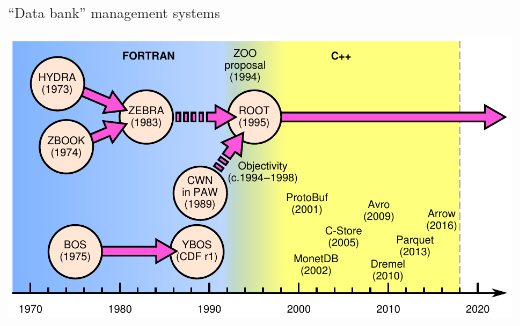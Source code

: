 \documentclass[aspectratio=169]{beamer}
\begin{document}
\begin{frame}{``Data bank'' management systems}
\vspace{0.25 cm}
\begin{center}
\includegraphics[width=0.95\linewidth]{history.pdf}
\end{center}
\end{frame}
\end{document}
